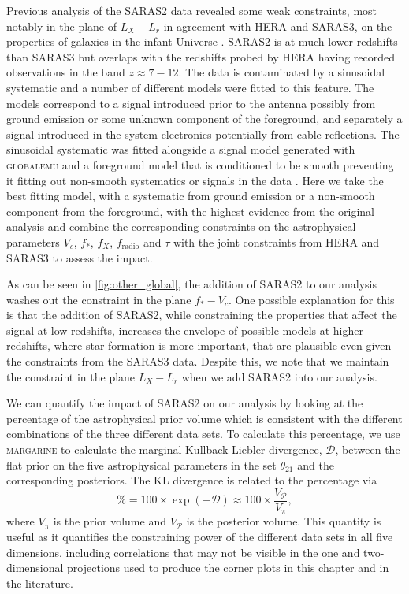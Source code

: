 Previous analysis of the SARAS2 data revealed some weak constraints, most notably in the plane of $L_X - L_{r}$ in agreement with HERA and SARAS3, on the properties of galaxies in the infant Universe \citep[e.g \cref{ch:saras2},][]{Bevins_SARAS2_2022}. SARAS2 is at much lower redshifts than SARAS3 but overlaps with the redshifts probed by HERA having recorded observations in the band $z\approx7-12$. The data is contaminated by a sinusoidal systematic and a number of different models were fitted to this feature. The models correspond to a signal introduced prior to the antenna possibly from ground emission or some unknown component of the foreground, and separately a signal introduced in the system electronics potentially from cable reflections. The sinusoidal systematic was fitted alongside a signal model generated with \textsc{globalemu} and a foreground model that is conditioned to be smooth preventing it fitting out non-smooth systematics or signals in the data \cite{Bevins_maxsmooth_2021}. Here we take the best fitting model, with a systematic from ground emission or a non-smooth component from the foreground, with the highest evidence from the original analysis \citep[see \cref{ch:saras2} and ][]{Bevins_SARAS2_2022} and combine the corresponding constraints on the astrophysical parameters $V_c$, $f_*$, $f_X$, $f_\mathrm{radio}$ and $\tau$ with the joint constraints from HERA and SARAS3 to assess the impact.

As can be seen in \cref{fig:other_global}, the addition of SARAS2 to our analysis washes out the constraint in the plane $f_* - V_c$. One possible explanation for this is that the addition of SARAS2, while constraining the properties that affect the signal at low redshifts, increases the envelope of possible models at higher redshifts, where star formation is more important, that are plausible even given the constraints from the SARAS3 data. Despite this, we note that we maintain the constraint in the plane $L_X - L_r$ when we add SARAS2 into our analysis.

We can quantify the impact of SARAS2 on our analysis by looking at the percentage of the astrophysical prior volume which is consistent with the different combinations of the three different data sets. To calculate this percentage, we use \textsc{margarine} to calculate the marginal Kullback-Liebler divergence, $\mathcal{D}$, between the flat prior on the five astrophysical parameters in the set $\theta_{21}$ and the corresponding posteriors. The KL divergence is related to the percentage via
\begin{equation}
    \% = 100\times\exp(-\mathcal{D}) \approx 100 \times \frac{V_\mathcal{P}}{V_\pi},
\end{equation}
where $V_\pi$ is the prior volume and $V_\mathcal{P}$ is the posterior volume. This quantity is useful as it quantifies the constraining power of the different data sets in all five dimensions, including correlations that may not be visible in the one and two-dimensional projections used to produce the corner plots in this chapter and in the literature. 

